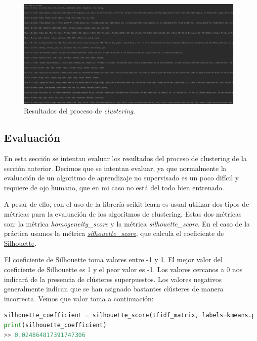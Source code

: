 \documentclass{uimppracticas}
\begin{document}
\begin{figure}[h]
	\centering
	\includegraphics[scale=0.35]{images/results}
	\caption{Resultados del proceso de \textit{clustering}.}
	\label{results}
\end{figure}

\subsection{Evaluación}

En esta sección se intentan evaluar los resultados del proceso de clustering de la sección anterior. Decimos que se intentan evaluar, ya que normalmente la evaluación de un algoritmo de aprendizaje no supervisado es un poco difícil y requiere de ojo humano, que en mi caso no está del todo bien entrenado.

A pesar de ello, con el uso de la librería scikit-learn es usual utilizar dos tipos de métricas para la evaluación de los algoritmos de clustering. Estas dos métricas son: la métrica \textit{homogeneity\_score} y la métrica \textit{silhouette\_score}. En el caso de la práctica usamos la métrica \href{https://scikit-learn.org/stable/modules/generated/sklearn.metrics.silhouette_score.html}{\textit{silhouette\_score}}, que calcula el coeficiente de \href{https://es.wikipedia.org/wiki/Silhouette_(clustering)}{Silhouette}.

El coeficiente de Silhouette toma valores entre -1 y 1. El mejor valor del coeficiente de Silhouette es 1 y el peor valor es -1. Los valores cercanos a 0 nos indicará de la presencia de clústeres superpuestos. Los valores negativos generalmente indican que se han asignado bastantes clústeres de manera incorrecta. Vemos que valor toma a continuación:

\begin{lstlisting}[language=python, basicstyle=\small]
silhouette_coefficient = silhouette_score(tfidf_matrix, labels=kmeans.predict(tfidf_matrix))
print(silhouette_coefficient)
>> 0.024864817391747306
\end{lstlisting}
\end{document}
